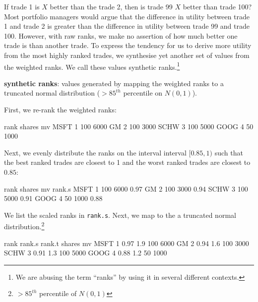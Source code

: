 \documentclass{article}
\begin{document}
If trade 1 is $X$ better than the trade 2, then is trade 99 $X$ better
than trade 100?  Most portfolio managers would argue that the
difference in utility between trade 1 and trade 2 is greater than the
difference in utility between trade 99 and trade 100.  However, with
raw ranks, we make no assertion of how much better one trade is than
another trade.  To express the tendency for us to derive more utility
from the most highly ranked trades, we synthesise yet another set of
values from the weighted ranks.  We call these values synthetic
ranks.\protect\footnote{We are abusing the term ``ranks'' by using it
in several different contexts.}

\begin{description}

\item{\bf{synthetic ranks}}: values generated by mapping the weighted
ranks to a truncated normal distribution ($> 85^{th}$ percentile on
$N(0,1)$).

\end{description}

First, we re-rank the weighted ranks:

\begin{Schunk}
\begin{Soutput}
     rank shares   mv
MSFT    1    100 6000
GM      2    100 3000
SCHW    3    100 5000
GOOG    4     50 1000
\end{Soutput}
\end{Schunk}

Next, we evenly distribute the ranks on the interval interval
$[0.85,1)$ such that the best ranked trades are closest to 1 and the
worst ranked trades are closest to $0.85$:

\begin{Schunk}
\begin{Soutput}
     rank shares   mv rank.s
MSFT    1    100 6000   0.97
GM      2    100 3000   0.94
SCHW    3    100 5000   0.91
GOOG    4     50 1000   0.88
\end{Soutput}
\end{Schunk}

We list the scaled ranks in \texttt{rank.s}.  Next, we map to the a
truncated normal distribution.\protect\footnote{$> 85^{th}$ percentile
of $N(0,1)$}


\begin{Schunk}
\begin{Soutput}
     rank rank.s rank.t shares   mv
MSFT    1   0.97    1.9    100 6000
GM      2   0.94    1.6    100 3000
SCHW    3   0.91    1.3    100 5000
GOOG    4   0.88    1.2     50 1000
\end{Soutput}
\end{Schunk}
\end{document}
